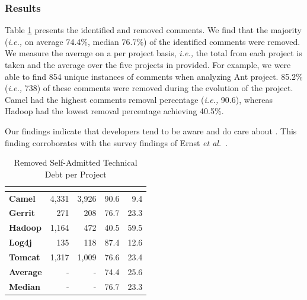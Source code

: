 

\subsubsection*{Results} Table \ref{tbl:removed_self_admitted_technical_debt_per_project} presents the identified and removed \SATD comments. We find that the majority (\textit{i.e.,} on average 74.4\%, median 76.7\%) of the identified \SATD comments were removed. We measure the average on a per project basis, \textit{i.e.,} the total from each project is taken and the average over the five projects in provided. For example, we were able to find 854 unique instances of \SATD comments when analyzing Ant project. 85.2\% (\textit{i.e.,} 738) of these \SATD comments were removed during the evolution of the project. Camel had the highest \SATD comments removal percentage (\textit{i.e.,} 90.6), whereas Hadoop had the lowest removal percentage achieving 40.5\%. 

Our findings indicate that developers tend to be aware and do care about \SATD. This finding corroborates with the survey findings of Ernst \emph{et al.}~\cite{Ernst2015FSE}.

\begin{table}[!t]
	\begin{center}
		\caption{Removed Self-Admitted Technical Debt per Project}
		\label{tbl:removed_self_admitted_technical_debt_per_project}
		\begin{tabular}{l|rrrr}
			\toprule
			\textbf{\thead{Project}} & \textbf{\thead{\#identified}} & \textbf{\thead{\#removed}} & \textbf{\thead{\% removed}} &  \textbf{\thead{\% remains}}  \\ 
			\midrule
			\textbf{Camel }  &  4,331  & 3,926  & 90.6  & 9.4\\
			\textbf{Gerrit}  &  271    & 208    & 76.7 & 23.3 \\
			\textbf{Hadoop}  &  1,164  & 472    & 40.5 & 59.5 \\  
			\textbf{Log4j }  &  135    & 118    & 87.4 & 12.6\\ 
			\textbf{Tomcat}  &  1,317  & 1,009  & 76.6 & 23.4\\   
			\midrule
			\textbf{Average} & -       & -      & 74.4 & 25.6\\
			\textbf{Median} & -       & -      & 76.7 & 23.3\\
			\bottomrule
		\end{tabular}
	\end{center}    
\end{table}

